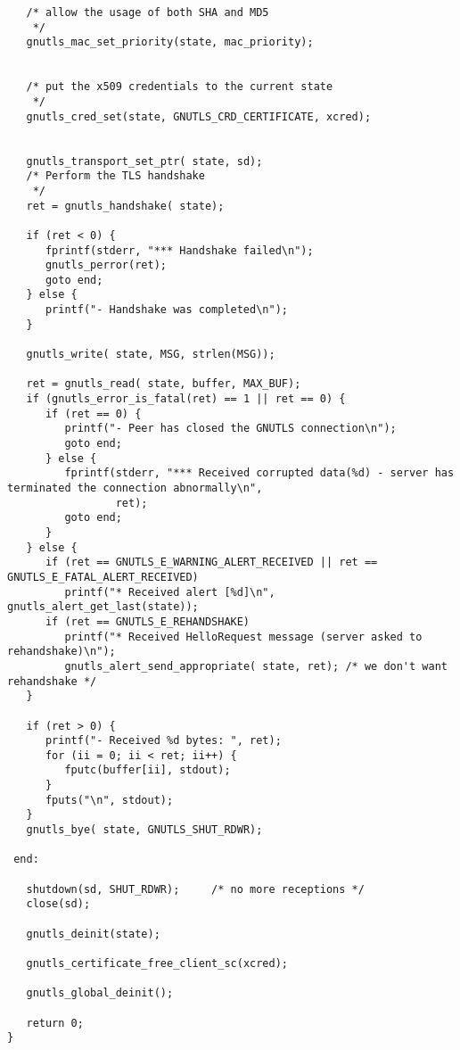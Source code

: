 \begin{verbatim}
   /* allow the usage of both SHA and MD5
    */
   gnutls_mac_set_priority(state, mac_priority);


   /* put the x509 credentials to the current state
    */
   gnutls_cred_set(state, GNUTLS_CRD_CERTIFICATE, xcred);


   gnutls_transport_set_ptr( state, sd);
   /* Perform the TLS handshake
    */
   ret = gnutls_handshake( state);

   if (ret < 0) {
      fprintf(stderr, "*** Handshake failed\n");
      gnutls_perror(ret);
      goto end;
   } else {
      printf("- Handshake was completed\n");
   }

   gnutls_write( state, MSG, strlen(MSG));

   ret = gnutls_read( state, buffer, MAX_BUF);
   if (gnutls_error_is_fatal(ret) == 1 || ret == 0) {
      if (ret == 0) {
         printf("- Peer has closed the GNUTLS connection\n");
         goto end;
      } else {
         fprintf(stderr, "*** Received corrupted data(%d) - server has terminated the connection abnormally\n",
                 ret);
         goto end;
      }
   } else {
      if (ret == GNUTLS_E_WARNING_ALERT_RECEIVED || ret == GNUTLS_E_FATAL_ALERT_RECEIVED)
         printf("* Received alert [%d]\n", gnutls_alert_get_last(state));
      if (ret == GNUTLS_E_REHANDSHAKE)
         printf("* Received HelloRequest message (server asked to rehandshake)\n");
         gnutls_alert_send_appropriate( state, ret); /* we don't want rehandshake */
   }

   if (ret > 0) {
      printf("- Received %d bytes: ", ret);
      for (ii = 0; ii < ret; ii++) {
         fputc(buffer[ii], stdout);
      }
      fputs("\n", stdout);
   }
   gnutls_bye( state, GNUTLS_SHUT_RDWR);

 end:

   shutdown(sd, SHUT_RDWR);     /* no more receptions */
   close(sd);

   gnutls_deinit(state);

   gnutls_certificate_free_client_sc(xcred);

   gnutls_global_deinit();

   return 0;
}

\end{verbatim}
